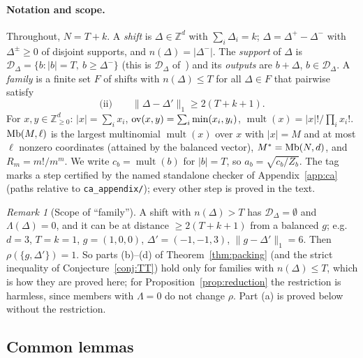 \documentclass[11pt]{article}
\newcommand{\Z}{\mathbb{Z}}
\newcommand{\mult}{\operatorname{mult}}
\theoremstyle{definition}
\theoremstyle{remark}
\newtheorem{remark}[theorem]{Remark}
\begin{document}
\paragraph{Notation and scope.} Throughout, $N=T+k$. A \emph{shift} is $\Delta\in\Z^d$ with $\sum_i\Delta_i=k$; $\Delta=\Delta^+-\Delta^-$ with
$\Delta^\pm\ge0$ of disjoint supports, and $n(\Delta)=|\Delta^-|$. The \emph{support} of $\Delta$ is $\mathcal D_\Delta=\{b:|b|=T,\ b\ge\Delta^-\}$
(this is $\mathcal D_{\Delta}$ of~\cite[Eq.~(111)]{Herasymenko2026}) and its \emph{outputs} are $b+\Delta$, $b\in\mathcal D_\Delta$.
A \emph{family} is a finite set $F$ of shifts with $n(\Delta)\le T$ for all $\Delta\in F$ that pairwise satisfy
\[
\text{(ii)}\qquad\lVert\Delta-\Delta'\rVert_1\ge2(T+k+1).
\]
For $x,y\in\Z_{\ge0}^d$: $|x|=\sum_ix_i$, $\mathrm{ov}(x,y)=\sum_i\min(x_i,y_i)$, $\mult(x)=|x|!/\prod_ix_i!$. $\mathrm{Mb}(M,\ell)$ is the largest multinomial
$\mult(x)$ over $x$ with $|x|=M$ and at most $\ell$ nonzero coordinates (attained by the balanced vector), $M^\ast=\mathrm{Mb}(N,d)$, and
$R_m=m!/m^m$. We write $c_b=\mult(b)$ for $|b|=T$, so $a_b=\sqrt{c_b/Z_b}$. The tag  marks a step certified by the named
standalone checker of Appendix~\ref{app:ca} (paths relative to \texttt{ca\_appendix/}); every other step is proved in the text.

\begin{remark}[Scope of ``family'']\label{rem:famscope}
A shift with $n(\Delta)>T$ has $\mathcal D_\Delta=\emptyset$ and $\Lambda(\Delta)=0$, and it can be at distance $\ge2(T+k+1)$ from a balanced $g$;
e.g.\ $d=3$, $T=k=1$, $g=(1,0,0)$, $\Delta'=(-1,-1,3)$, $\lVert g-\Delta'\rVert_1=6$. Then $\rho(\{g,\Delta'\})=1$. So parts (b)--(d) of
Theorem~\ref{thm:packing} (and the strict inequality of Conjecture~\ref{conj:TT}) hold only for families with $n(\Delta)\le T$, which is how they
are proved here; for Proposition~\ref{prop:reduction} the restriction is harmless, since members with $\Lambda=0$ do not change $\rho$.
Part (a) is proved below without the restriction.
\end{remark}

\subsection{Common lemmas}
\end{document}
